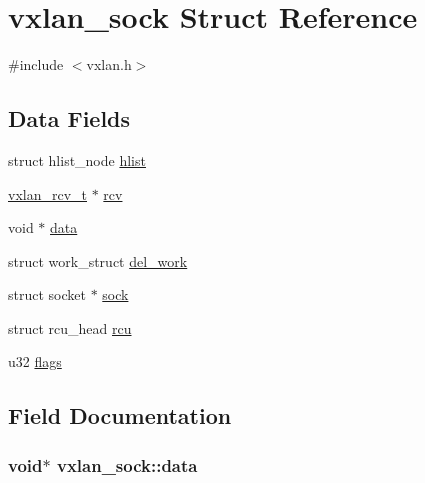 \hypertarget{structvxlan__sock}{}\section{vxlan\+\_\+sock Struct Reference}
\label{structvxlan__sock}


{\ttfamily \#include $<$vxlan.\+h$>$}

\subsection*{Data Fields}
\begin{DoxyCompactItemize}
\item 
struct hlist\+\_\+node \hyperlink{structvxlan__sock_aa49d034f0fff69c29cb3313b17caea80}{hlist}
\item 
\hyperlink{vxlan_8h_a8de966706f4eb1f2059020f4ec31aa6f}{vxlan\+\_\+rcv\+\_\+t} $\ast$ \hyperlink{structvxlan__sock_a62dbbfc22620a8120799bad80e04c639}{rcv}
\item 
void $\ast$ \hyperlink{structvxlan__sock_a44942474f147992d768c3a74b44c4d5f}{data}
\item 
struct work\+\_\+struct \hyperlink{structvxlan__sock_a951b7a9ee28672b49838176513bf343d}{del\+\_\+work}
\item 
struct socket $\ast$ \hyperlink{structvxlan__sock_a75f35ac3f5f8e0340b2bdc247a84c322}{sock}
\item 
struct rcu\+\_\+head \hyperlink{structvxlan__sock_a3ab897e7f7d97d2f2bf71791f5ebffdb}{rcu}
\item 
u32 \hyperlink{structvxlan__sock_ac3711b8cc4c992e3270dee5791a542cf}{flags}
\end{DoxyCompactItemize}


\subsection{Field Documentation}
\hypertarget{structvxlan__sock_a44942474f147992d768c3a74b44c4d5f}{}
\subsubsection[{data}]{\setlength{\rightskip}{0pt plus 5cm}void$\ast$ vxlan\+\_\+sock\+::data}\label{structvxlan__sock_a44942474f147992d768c3a74b44c4d5f}
\hypertarget{structvxlan__sock_a951b7a9ee28672b49838176513bf343d}{}
